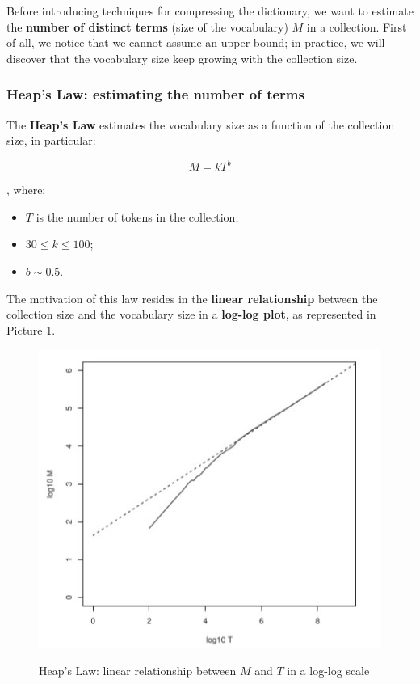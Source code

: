 Before introducing techniques for compressing the dictionary, we want to estimate the \textbf{number of distinct terms} (size of the vocabulary) $M$ in a collection. First of all, we notice that we cannot assume an upper bound; in practice, we will discover that the vocabulary size keep growing with the collection size.

\subsubsection{Heap's Law: estimating the number of terms}
The \textbf{Heap's Law} estimates the vocabulary size as a function of the collection size, in particular:

$$
M = kT^b
$$

, where:

\begin{itemize}
    \item $T$ is the number of tokens in the collection;
    \item $30 \leq k \leq 100$;
    \item $b \sim 0.5$.
\end{itemize}

The motivation of this law resides in the \textbf{linear relationship} between the collection size and the vocabulary size in a \textbf{log-log plot}, as represented in Picture \ref{heap}. 

\begin{figure}[h!]
		\centering
		\includegraphics[scale = 1.7]{img/Heap law.jpg}
		\label{heap}
        \caption{Heap's Law: linear relationship between $M$ and $T$ in a log-log scale}
\end{figure}

